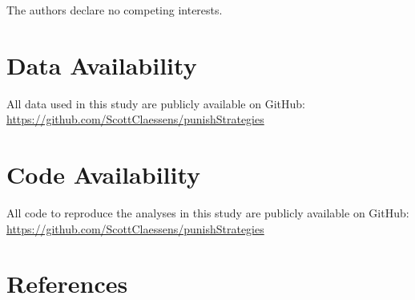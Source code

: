 \documentclass[
  man,floatsintext]{apa6}
\begin{document}
The authors declare no competing interests.

\hypertarget{data-availability}{%
\section{Data Availability}\label{data-availability}}

All data used in this study are publicly available on GitHub: \url{https://github.com/ScottClaessens/punishStrategies}

\hypertarget{code-availability}{%
\section{Code Availability}\label{code-availability}}

All code to reproduce the analyses in this study are publicly available on GitHub: \url{https://github.com/ScottClaessens/punishStrategies}

\newpage

\hypertarget{references}{%
\section{References}\label{references}}

\begingroup
\end{document}
